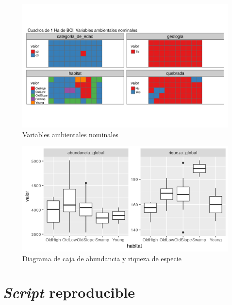 \documentclass[11pt,]{article}
\begin{document}
\begin{figure}
\centering
\includegraphics[width=1.10000\textwidth]{mapas_variables_ambientales_nominales_tmap.png}
\caption{Variables ambientales nominales}
\end{figure}

\begin{figure}
\centering
\includegraphics[width=1.10000\textwidth]{Plot_abnd_riqz.png}
\caption{Diagrama de caja de abundancia y riqueza de especie}
\end{figure}

\section{\texorpdfstring{\emph{Script}
reproducible}{Script reproducible}}\label{script-reproducible}
\end{document}
